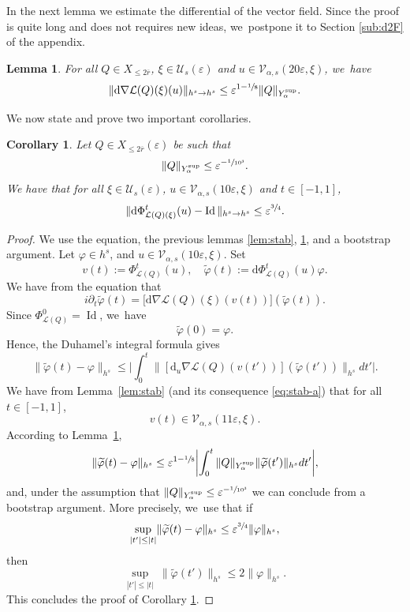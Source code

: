 \documentclass[10pt,a4paper]{amsart}
\theoremstyle{plain}
\newtheorem{corollary}[theorem]{Corollary}
\newtheorem{lemma}[theorem]{Lemma}
\theoremstyle{definition}
\DeclareMathOperator{\Id}{Id}
\newcommand{\1}{\mathbf{1}}
\newcommand{\Ysup}[1]{Y_{#1}^{\mathrm{sup}}}
\let\epsilon\varepsilon
\begin{document}
In the next lemma we estimate the differential of the vector field. Since the proof is quite long and does not requires new ideas, we~postpone it to Section \ref{sub:d2F} of the appendix.
\begin{lemma}
\label{lem:d2F} For all $Q\in X_{\leq2\overline{r}}$, $\xi\in\mathcal{U}_{s}(\epsilon)$ and $u\in\mathcal{V}_{\alpha,s}(20\epsilon,\xi)$, we~have
\[
\| \mathrm{d}\nabla\mathcal{L}(Q)(\xi)(u)\|_{h^s\to h^s}
\leq
\epsilon^{1-\sfrac{1}{8}}
\|Q\|_{\Ysup{\alpha}}.
\]
\end{lemma}

We now state and prove two important corollaries.

\begin{corollary}\label{cor:dphi} Let $Q\in X_{\leq2\overline{r}}(\epsilon)$ be such that
\[
\|Q\|_{\Ysup{\alpha}}\leq \epsilon^{-\sfrac{1}{10^{3}}}.
\]
We have that for all $\xi\in\mathcal{U}_{s}(\epsilon)$, $u\in\mathcal{V}_{\alpha,s}(10\epsilon,\xi)$ and $t\in[-1,1]$,
\[
\|\mathrm{d}\Phi_{\mathcal{L}(Q)(\xi)}^t(u) - \Id \|_{h^{s}\to h^{s}} \leq \epsilon^{\sfrac{3}{4}}.
\]
\end{corollary}
\begin{proof}
We use the equation, the previous lemmas \ref{lem:stab}, \ref{lem:d2F}, and a bootstrap argument. Let $\varphi \in h^{s}$, and $u\in\mathcal{V}_{\alpha,s}(10\epsilon,\xi)$. Set
\[
v(t) := \Phi^t_{\mathcal{L}(Q)}(u),\quad \widetilde{\varphi}(t) := \mathrm{d}\Phi^{t}_{\mathcal{L}(Q)}(u)\varphi.
\]
We have from the equation that
\[
i\partial_{t}\widetilde{\varphi}(t) =
\big[
\mathrm{d}\nabla\mathcal{L}(Q)(\xi)(v(t))
\big]
(\widetilde{\varphi}(t)).
\]
Since $\Phi^{0}_{\mathcal{L}(Q)}=\operatorname{Id}$, we~have
\[
\widetilde{\varphi}(0)= \varphi.
\]
Hence, the Duhamel's integral formula gives
\[
\|\widetilde{\varphi}(t) - \varphi\|_{h^{s}}
\leq
\biggl|
\int_0^t
\bigl\|
[\mathrm{d}_{u}\nabla\mathcal{L}(Q)(v(t'))
]
(\widetilde{\varphi}(t'))
\bigr\|_{h^{s}}dt'
\biggr|.
\]
We have from Lemma~\ref{lem:stab} (and its consequence \eqref{eq:stab-a}) that for all $t\in[-1,1]$,
\[
v(t)\in\mathcal{V}_{\alpha,s}(11\epsilon,\xi).
\]
According to Lemma~\ref{lem:d2F},
\[
\|\widetilde{\varphi}(t)-\varphi\|_{h^{s}}
\leq \epsilon^{1-\sfrac{1}{8}}\biggl|\int_0^t
\|Q\|_{\Ysup{\alpha}}
\|\widetilde{\varphi}(t')
\|_{h^{s}}dt'\biggr|,
\]
and, under the assumption that $\|Q\|_{\Ysup{\alpha}}\leq \epsilon^{-\sfrac{1}{10^{3}}}$ we can conclude from a bootstrap argument. More precisely, we~use that if
\[
\underset{|t'|\leq |t|}{\sup}\|\widetilde{\varphi}(t)-\varphi\|_{h^{s}}
\leq
\epsilon^{\sfrac{3}{4}}
\|\varphi\|_{h^{s}},
\]
then
\[
\underset{|t'|\leq |t|}{\sup}\
\|\widetilde{\varphi}(t')
\|_{h^{s}}
\leq
2\|\varphi\|_{h^{s}}.
\]
This concludes the proof of Corollary \ref{cor:dphi}.
\end{proof}
\end{document}
